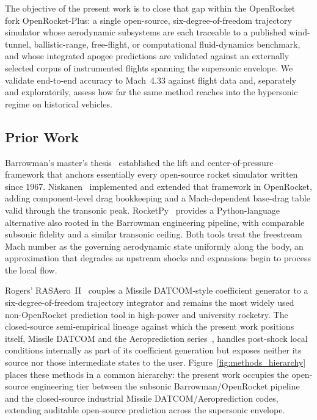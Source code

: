 The objective of the present work is to close that gap within the OpenRocket
fork OpenRocket-Plus: a single open-source, six-degree-of-freedom trajectory
simulator whose aerodynamic subsystems are each traceable to a published
wind-tunnel, ballistic-range, free-flight, or computational fluid-dynamics
benchmark, and whose integrated apogee predictions are validated against an
externally selected corpus of instrumented flights spanning the supersonic
envelope. We validate end-to-end accuracy to Mach~4.33 against flight data and,
separately and exploratorily, assess how far the same method reaches into the
hypersonic regime on historical vehicles.

\subsection{Prior Work}

Barrowman's master's thesis~\cite{barrowman1967} established the lift and
center-of-pressure framework that anchors essentially every open-source rocket
simulator written since 1967. Niskanen~\cite{niskanen2009} implemented and
extended that framework in OpenRocket, adding component-level drag bookkeeping
and a Mach-dependent base-drag table valid through the transonic peak.
RocketPy~\cite{rocketpy2021} provides a Python-language alternative also rooted
in the Barrowman engineering pipeline, with comparable subsonic fidelity and a
similar transonic ceiling. Both tools treat the freestream Mach number as the
governing aerodynamic state uniformly along the body, an approximation that
degrades as upstream shocks and expansions begin to process the local flow.

Rogers' RASAero~II~\cite{rogers2015} couples a Missile DATCOM-style coefficient
generator to a six-degree-of-freedom trajectory integrator and remains the most
widely used non-OpenRocket prediction tool in high-power and university
rocketry. The closed-source semi-empirical lineage against which the present
work positions itself, Missile DATCOM and the Aeroprediction
series~\cite{moore2001,mooremcinvillehymer2002,sooy2005}, handles post-shock
local conditions internally as part of its coefficient generation but exposes
neither its source nor those intermediate states to the user. Figure~\ref{fig:methods_hierarchy}
places these methods in a common hierarchy: the present work occupies the
open-source engineering tier between the subsonic Barrowman/OpenRocket pipeline
and the closed-source industrial Missile DATCOM/Aeroprediction codes, extending
auditable open-source prediction across the supersonic envelope.

